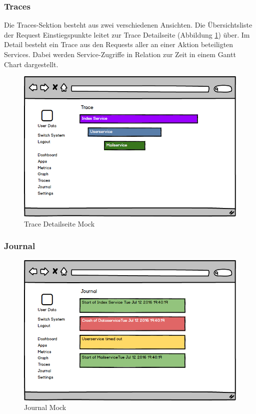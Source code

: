 \subsubsection{Traces}

Die Traces-Sektion besteht aus zwei verschiedenen Ansichten. Die Übersichtsliste der Request Einstiegspunkte
leitet zur Trace Detailseite (Abbildung \ref{fig:trace}) über. Im Detail besteht ein Trace aus den Requests
aller an einer Aktion beteiligten Services. Dabei werden Service-Zugriffe in Relation zur Zeit in einem Gantt Chart dargestellt.

\vspace{0.3cm}
\begin{figure}[h]
 \centering
 \includegraphics[width=0.7\linewidth]{kapitel1/mocks/trace.png}
 \caption{Trace Detailseite Mock}
 \label{fig:trace}
\end{figure}


\subsubsection{Journal}

\begin{figure}[h]
 \centering
 \includegraphics[width=0.7\linewidth]{kapitel1/mocks/journal.png}
 \caption{Journal Mock}
 \label{fig:journalmock}
\end{figure}

